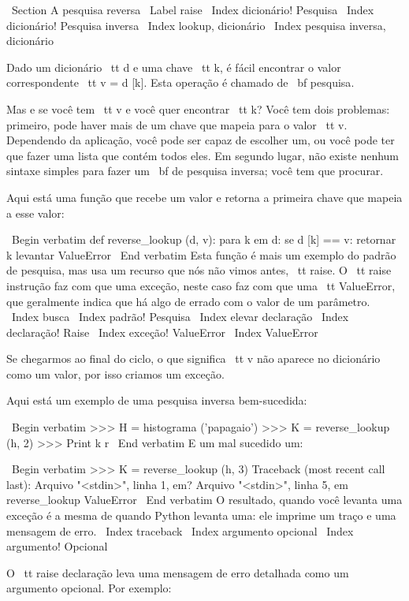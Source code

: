 \documentclass[10pt]{book}
\begin{document}
{{{{{{{\ Section {A pesquisa reversa}
\ Label {} raise
\ Index {dicionário! Pesquisa}
\ Index {dicionário! Pesquisa inversa}
\ Index {lookup, dicionário}
\ Index {pesquisa inversa, dicionário}

Dado um dicionário {\ tt d} e uma chave {\ tt k}, é fácil
encontrar o valor correspondente {\ tt v = d [k]}. Esta operação
é chamado de {\ bf pesquisa}.

Mas e se você tem {\ tt v} e você quer encontrar {\ tt k}?
Você tem dois problemas: primeiro, pode haver mais de um
chave que mapeia para o valor {\ tt v}. Dependendo da aplicação,
você pode ser capaz de escolher um, ou você pode ter que fazer
uma lista que contém todos eles. Em segundo lugar, não existe nenhum
sintaxe simples para fazer um {\ bf de pesquisa inversa}; você tem que procurar.

Aqui está uma função que recebe um valor e retorna a primeira
chave que mapeia a esse valor:

\ Begin {verbatim}
def reverse_lookup (d, v):
    para k em d:
        se d [k] == v:
            retornar k
    levantar ValueError
\ End {verbatim}
%
Esta função é mais um exemplo do padrão de pesquisa, mas
usa um recurso que nós não vimos antes, {\ tt raise}. O {\ tt raise}
instrução faz com que uma exceção, neste caso faz com que uma {\ tt
  ValueError}, que geralmente indica que há algo de errado
com o valor de um parâmetro.
\ Index {busca}
\ Index {padrão! Pesquisa}
\ Index {elevar declaração}
\ Index {declaração! Raise}
\ Index {exceção! ValueError}
\ Index {} ValueError

Se chegarmos ao final do ciclo, o que significa {\ tt v}
não aparece no dicionário como um valor, por isso criamos um
exceção.

Aqui está um exemplo de uma pesquisa inversa bem-sucedida:

\ Begin {verbatim}
>>> H = histograma ('papagaio')
>>> K = reverse_lookup (h, 2)
>>> Print k
r
\ End {verbatim}
%
E um mal sucedido um:

\ Begin {verbatim}
>>> K = reverse_lookup (h, 3)
Traceback (most recent call last):
  Arquivo "<stdin>", linha 1, em?
  Arquivo "<stdin>", linha 5, em reverse_lookup
ValueError
\ End {verbatim}
%
O resultado, quando você levanta uma exceção é a mesma de quando
Python levanta uma: ele imprime um traço e uma mensagem de erro.
\ Index {} traceback
\ Index {argumento opcional}
\ Index {argumento! Opcional}

O {\ tt raise} declaração leva uma mensagem de erro detalhada como um
argumento opcional. Por exemplo:

}}}}}}}
\end{document}

